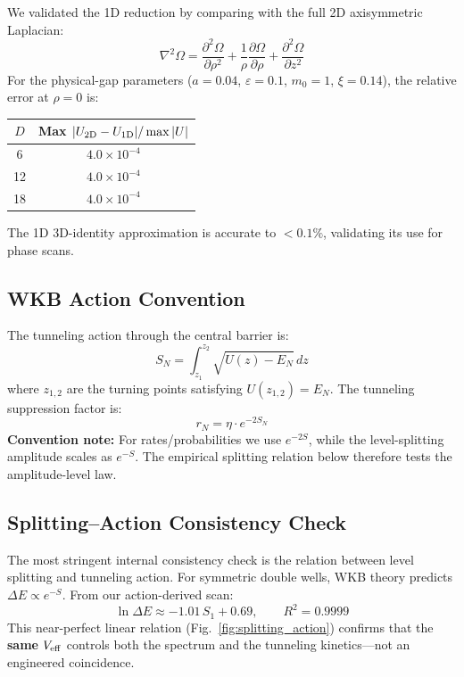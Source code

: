 \documentclass[aps,prd,onecolumn,notitlepage,nofootinbib,superscriptaddress,11pt,floatfix]{revtex4-2}
\begin{document}
We validated the 1D reduction by comparing with the full 2D axisymmetric Laplacian:
\begin{equation}
\nabla^2\Omega = \frac{\partial^2\Omega}{\partial\rho^2} + \frac{1}{\rho}\frac{\partial\Omega}{\partial\rho} + \frac{\partial^2\Omega}{\partial z^2}
\end{equation}
For the physical-gap parameters ($a=0.04$, $\varepsilon=0.1$, $m_0=1$, $\xi=0.14$), the relative error at $\rho=0$ is:
\begin{center}
\begin{tabular}{cc}
\hline
$D$ & Max $|U_{\rm 2D} - U_{\rm 1D}|/\max|U|$ \\
\hline
6 & $4.0 \times 10^{-4}$ \\
12 & $4.0 \times 10^{-4}$ \\
18 & $4.0 \times 10^{-4}$ \\
\hline
\end{tabular}
\end{center}
The 1D 3D-identity approximation is accurate to $< 0.1\%$, validating its use for phase scans.

\subsection{WKB Action Convention}
\label{app:WKB}

The tunneling action through the central barrier is:
\begin{equation}
S_N = \int_{z_1}^{z_2} \sqrt{U(z) - E_N}\, dz
\label{eq:SN_def}
\end{equation}
where $z_{1,2}$ are the turning points satisfying $U(z_{1,2}) = E_N$. The tunneling suppression factor is:
\begin{equation}
r_N = \eta \cdot e^{-2S_N}
\end{equation}
\textbf{Convention note:} For rates/probabilities we use $e^{-2S}$, while the level-splitting amplitude scales as $e^{-S}$. The empirical splitting relation below therefore tests the amplitude-level law.

\subsection{Splitting--Action Consistency Check}
\label{app:splitting}

The most stringent internal consistency check is the relation between level splitting and tunneling action. For symmetric double wells, WKB theory predicts $\Delta E \propto e^{-S}$. From our action-derived scan:
\begin{equation}
\boxed{\ln\Delta E \approx -1.01\,S_1 + 0.69, \qquad R^2 = 0.9999}
\end{equation}
This near-perfect linear relation (Fig.~\ref{fig:splitting_action}) confirms that the \textbf{same} $V_{\rm eff}$ controls both the spectrum and the tunneling kinetics---not an engineered coincidence.
\end{document}
